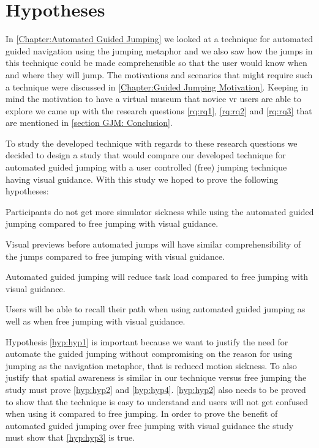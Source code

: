 \label{Chapter:Design and Procedure of the User Study}
\section{Hypotheses}
\label{section DPUS: Hypotheses}
In \cref{Chapter:Automated Guided Jumping} we looked at a technique for automated guided navigation using the jumping metaphor and we also saw how the jumps in this technique could be made comprehensible so that the user would know when and where they will jump. The motivations and scenarios that might require such a technique were discussed in \cref{Chapter:Guided Jumping Motivation}. Keeping in mind the motivation to have a virtual museum that novice \acrshort{vr} users are able to explore we came up with the research questions \cref{rq:rq1}, \cref{rq:rq2} and \cref{rq:rq3} that are mentioned in \cref{section GJM: Conclusion}.

To study the developed technique with regards to these research questions we decided to design a study that would compare our developed technique for automated guided jumping with a user controlled (free) jumping technique having visual guidance. With this study we hoped to prove the following hypotheses:

\begin{hypothesis}
	\label{hyp:hyp1}
	Participants do not get more simulator sickness while using the automated guided jumping compared to free jumping with visual guidance.
\end{hypothesis}
\begin{hypothesis}
	\label{hyp:hyp2}
	Visual previews before automated jumps will have similar comprehensibility of the jumps compared to free jumping with visual guidance.
\end{hypothesis}
\begin{hypothesis}
	\label{hyp:hyp3}
	Automated guided jumping will reduce task load compared to free jumping with visual guidance.
\end{hypothesis}
\begin{hypothesis}
	\label{hyp:hyp4}
	Users will be able to recall their path when using automated guided jumping as well as when free jumping with visual guidance.
\end{hypothesis}

Hypothesis \cref{hyp:hyp1} is important because we want to justify the need for automate the guided jumping without compromising on the reason for using jumping as the navigation metaphor, that is reduced motion sickness. To also justify that spatial awareness is similar in our technique versus free jumping the study must prove \cref{hyp:hyp2} and \cref{hyp:hyp4}. \cref{hyp:hyp2}  also needs to be proved to show that the technique is easy to understand and users will not get confused when using it compared to free jumping. In order to prove the benefit of automated guided jumping over free jumping with visual guidance the study must show that \cref{hyp:hyp3} is true.  

